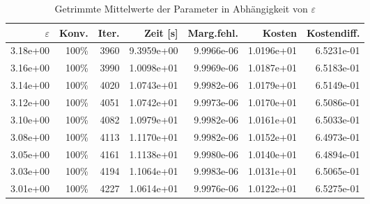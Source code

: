 \begin{table}[htbp]
\caption{Getrimmte Mittelwerte der Parameter in Abhängigkeit von $\varepsilon$}
\label{tab:Parametertest2048_2}
\small
\centering
{}
\begin{tabular}{rrrrrrr}
\toprule
$\varepsilon$ & Konv. & Iter. & Zeit [s] & Marg.fehl. & Kosten & Kostendiff. \\
\midrule
3.18e+00 & 100\% & 3960 & 9.3959e+00 & 9.9966e-06 & 1.0196e+01 & 6.5231e-01 \\
3.16e+00 & 100\% & 3990 & 1.0098e+01 & 9.9969e-06 & 1.0187e+01 & 6.5183e-01 \\
3.14e+00 & 100\% & 4020 & 1.0743e+01 & 9.9982e-06 & 1.0179e+01 & 6.5149e-01 \\
3.12e+00 & 100\% & 4051 & 1.0742e+01 & 9.9973e-06 & 1.0170e+01 & 6.5086e-01 \\
3.10e+00 & 100\% & 4082 & 1.0979e+01 & 9.9982e-06 & 1.0161e+01 & 6.5033e-01 \\
3.08e+00 & 100\% & 4113 & 1.1170e+01 & 9.9982e-06 & 1.0152e+01 & 6.4973e-01 \\
3.05e+00 & 100\% & 4161 & 1.1138e+01 & 9.9980e-06 & 1.0140e+01 & 6.4894e-01 \\
3.03e+00 & 100\% & 4194 & 1.1064e+01 & 9.9983e-06 & 1.0131e+01 & 6.5065e-01 \\
3.01e+00 & 100\% & 4227 & 1.0614e+01 & 9.9976e-06 & 1.0122e+01 & 6.5275e-01 \\
\bottomrule
\end{tabular}
\end{table}
